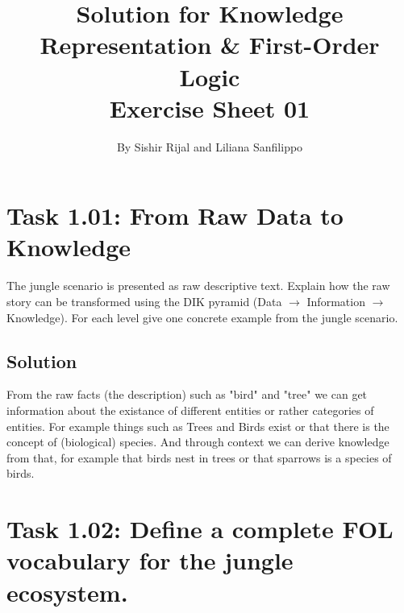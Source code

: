 \documentclass[11pt,a4paper]{article}
\author{By Sishir Rijal and Liliana Sanfilippo}
\title{\textbf{Solution for Knowledge Representation \& First-Order Logic\\[4pt]
Exercise Sheet 01}}
\date{}
\newenvironment{solution}{%
    \begin{tcolorbox}[
        breakable,
        colback=green!4,
        colframe=green!50!black,
        fonttitle=\bfseries,
        title={ Solution},
        left=6pt, right=6pt, top=4pt, bottom=4pt
    ]%
    }{%
    \end{tcolorbox}%
}
\begin{document}
    \maketitle
    \section*{}

    \section*{Task 1.01: From Raw Data to Knowledge}

    The jungle scenario is presented as raw descriptive text. Explain how the raw story can be transformed using the DIK pyramid
    (Data $\to$ Information $\to$ Knowledge). For each level give one concrete example from the jungle scenario.

    \subsection*{Solution}
    \begin{solution}

        From the raw facts (the description) such as "bird" and "tree" we can get information about the existance of different entities or rather categories of entities. For example things such as Trees and Birds exist or that there is the concept of (biological) species. And through context we can derive knowledge from that, for example that birds nest in trees or that sparrows is a species of birds. \end{solution}





    \section*{Task 1.02: Define a complete FOL vocabulary for the jungle ecosystem.}
\end{document}
